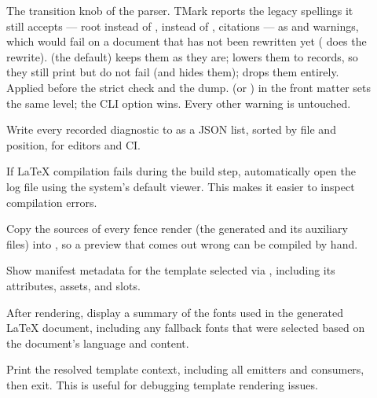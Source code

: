 \documentclass[a4paper,twoside]{article}
\begin{document}
\begin{description}
\item[{}] The transition knob of the parser. TMark reports the legacy spellings it still accepts --- root  instead of ,  instead of , \tscodeinline{[\^{}key]} citations --- as  and  warnings, which would fail  on a document that has not been rewritten yet ( does the rewrite).  (the default) keeps them as they are;  lowers them to  records, so they still print but do not fail  (and  hides them);  drops them entirely. Applied before the strict check and the  dump.  (or ) in the front matter sets the same level; the CLI option wins. Every other warning is untouched.
\item[{}] Write every recorded diagnostic to  as a JSON list, sorted by file and position, for editors and CI.
\item[{}] If \LaTeX{} compilation fails during the build step, automatically open the  log file using the system's default viewer. This makes it easier to inspect compilation errors.
\item[{}] Copy the sources of every  fence render (the generated  and its auxiliary files) into , so a preview that comes out wrong can be compiled by hand.
\item[{}] Show manifest metadata for the template selected via , including its attributes, assets, and slots.
\item[{}] After rendering, display a summary of the fonts used in the generated \LaTeX{} document, including any fallback fonts that were selected based on the document's language and content.
\item[{}] Print the resolved template context, including all emitters and consumers, then exit. This is useful for debugging template rendering issues.
\end{description}
\end{document}
